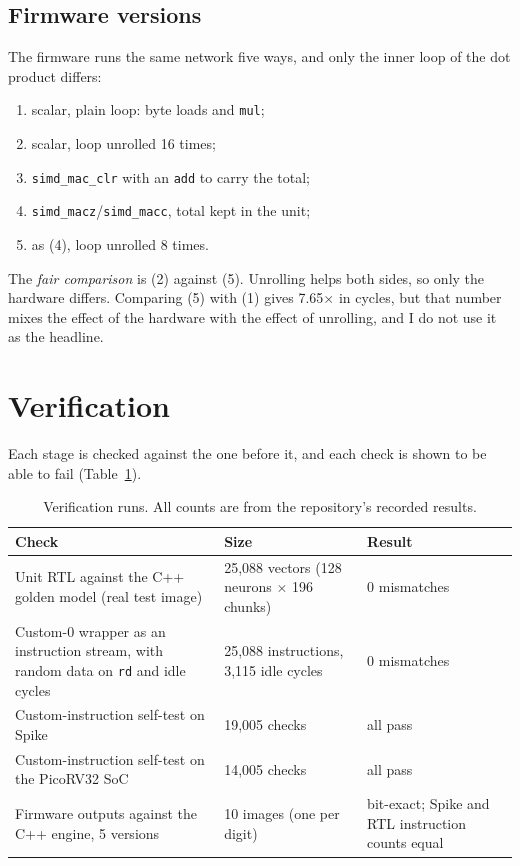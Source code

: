 \documentclass[10pt,a4paper]{article}
\newcommand{\simd}[1]{\texttt{simd\_#1}}
\begin{document}
\subsection{Firmware versions}
The firmware runs the same network five ways, and only the inner loop of the dot product differs:

\begin{enumerate}[label=(\arabic*)]
\item scalar, plain loop: byte loads and \texttt{mul};
\item scalar, loop unrolled 16 times;
\item \simd{mac\_clr} with an \texttt{add} to carry the total;
\item \simd{macz}/\simd{macc}, total kept in the unit;
\item as (4), loop unrolled 8 times.
\end{enumerate}

The \emph{fair comparison} is (2) against (5). Unrolling helps both sides, so only the hardware differs. Comparing (5) with (1) gives 7.65$\times$ in cycles, but that number mixes the effect of the hardware with the effect of unrolling, and I do not use it as the headline.

\section{Verification}
Each stage is checked against the one before it, and each check is shown to be able to fail (Table~\ref{tab:verify}).

\begin{table}[htbp]
\centering
\caption{Verification runs. All counts are from the repository's recorded results.}
\label{tab:verify}
\small
\begin{tabular}{@{}p{6.6cm}p{3.9cm}p{5.4cm}@{}}
\toprule
Check & Size & Result \\
\midrule
Unit RTL against the C++ golden model (real test image) & 25,088 vectors (128 neurons $\times$ 196 chunks) & 0 mismatches \\
Custom-0 wrapper as an instruction stream, with random data on \texttt{rd} and idle cycles & 25,088 instructions, 3,115 idle cycles & 0 mismatches \\
Custom-instruction self-test on Spike & 19,005 checks & all pass \\
Custom-instruction self-test on the PicoRV32 SoC & 14,005 checks & all pass \\
Firmware outputs against the C++ engine, 5 versions & 10 images (one per digit) & bit-exact; Spike and RTL instruction counts equal \\
\bottomrule
\end{tabular}
\end{table}
\end{document}
